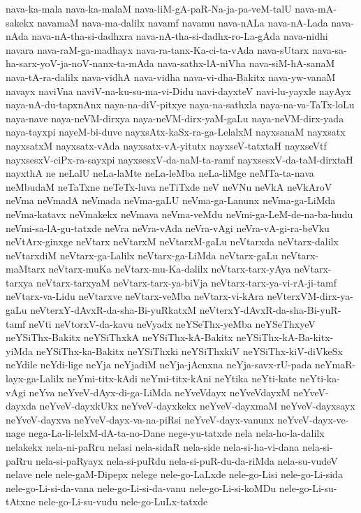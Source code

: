 {nava-ka-mala
nava-ka-malaM
nava-liM-gA-paR-Na-ja-pa-veM-talU
nava-mA-sakekx
navamaM
nava-ma-dalilx
navamf
navamu
nava-nALa
nava-nA-Lada
nava-nAda
nava-nA-tha-si-dadhxra
nava-nA-tha-si-dadhx-ro-La-gAda
nava-nidhi
navara
nava-raM-ga-madhayx
nava-ra-tanx-Ka-ci-ta-vAda
nava-sUtarx
nava-sa-ha-sarx-yoV-ja-noV-nanx-ta-mAda
nava-sathx-lA-niVha
nava-siM-hA-sanaM
nava-tA-ra-dalilx
nava-vidhA
nava-vidha
nava-vi-dha-Bakitx
nava-yw-vanaM
navayx
naviVna
naviV-na-ku-su-ma-vi-Didu
navi-dayxteV
navi-lu-yayxle
nayAyx
naya-nA-du-tapxnAnx
naya-na-diV-pitxye
naya-na-sathxla
naya-na-va-TaTx-loLu
naya-nave
naya-neVM-dirxya
naya-neVM-dirx-yaM-gaLu
naya-neVM-dirx-yada
naya-tayxpi
nayeM-bi-duve
nayxsAtx-kaSx-ra-ga-LelalxM
nayxsanaM
nayxsatx
nayxsatxM
nayxsatx-vAda
nayxsatx-vA-yitutx
nayxseV-tatxtaH
nayxseVtf
nayxsesxV-ciPx-ra-sayxpi
nayxsesxV-da-naM-ta-ramf
nayxsesxV-da-taM-dirxtaH
nayxthA
ne
neLalU
neLa-laMte
neLa-leMba
neLa-liMge
neMTa-ta-nava
neMbudaM
neTaTxne
neTeTx-luva
neTiTxde
neV
neVNu
neVkA
neVkAroV
neVma
neVmadA
neVmada
neVma-gaLU
neVma-ga-Lanunx
neVma-ga-LiMda
neVma-katavx
neVmakekx
neVmava
neVma-veMdu
neVmi-ga-LeM-de-na-ba-hudu
neVmi-sa-lA-gu-tatxde
neVra
neVra-vAda
neVra-vAgi
neVra-vA-gi-ra-beVku
neVtArx-ginxge
neVtarx
neVtarxM
neVtarxM-gaLu
neVtarxda
neVtarx-dalilx
neVtarxdiM
neVtarx-ga-Lalilx
neVtarx-ga-LiMda
neVtarx-gaLu
neVtarx-maMtarx
neVtarx-muKa
neVtarx-mu-Ka-dalilx
neVtarx-tarx-yAya
neVtarx-tarxya
neVtarx-tarxyaM
neVtarx-tarx-ya-biVja
neVtarx-tarx-ya-vi-rA-ji-tamf
neVtarx-va-Lidu
neVtarxve
neVtarx-veMba
neVtarx-vi-kAra
neVterxVM-dirx-ya-gaLu
neVterxY-dAvxR-da-sha-Bi-yuRkatxM
neVterxY-dAvxR-da-sha-Bi-yuR-tamf
neVti
neVtorxV-da-kavu
neVyadx
neYSeThx-yeMba
neYSeThxyeV
neYSiThx-Bakitx
neYSiThxkA
neYSiThx-kA-Bakitx
neYSiThx-kA-Ba-kitx-yiMda
neYSiThx-ka-Bakitx
neYSiThxki
neYSiThxkiV
neYSiThx-kiV-diVkeSx
neYdile
neYdi-lige
neYja
neYjadiM
neYja-jAcnxna
neYja-savx-rU-pada
neYmaR-layx-ga-Lalilx
neYmi-titx-kAdi
neYmi-titx-kAni
neYtika
neYti-kate
neYti-ka-vAgi
neYva
neYveV-dAyx-di-ga-LiMda
neYveVdayx
neYveVdayxM
neYveV-dayxda
neYveV-dayxkUkx
neYveV-dayxkekx
neYveV-dayxmaM
neYveV-dayxsayx
neYveV-dayxva
neYveV-dayx-va-na-piRsi
neYveV-dayx-vanunx
neYveV-dayx-ve-nage
nega-La-li-lelxM-dA-ta-no-Dane
nege-yu-tatxde
nela
nela-ho-la-dalilx
nelakekx
nela-ni-paRru
nelasi
nela-sidaR
nela-side
nela-si-ha-vi-dana
nela-si-paRru
nela-si-paRyayx
nela-si-puRdu
nela-si-puR-du-da-riMda
nela-su-vudeV
nelave
nele
nele-gaM-Dipepx
nelege
nele-go-LaLxde
nele-go-Lisi
nele-go-Li-sida
nele-go-Li-si-da-vana
nele-go-Li-si-da-vanu
nele-go-Li-si-koMDu
nele-go-Li-su-tAtxne
nele-go-Li-su-vudu
nele-go-LuLx-tatxde
}
